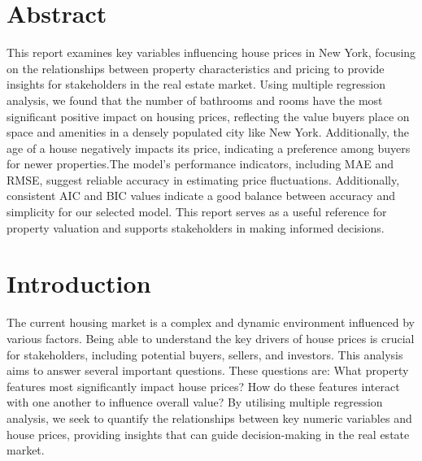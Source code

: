 \documentclass[
  twocolumn]{article}
\author{}
\date{}
\begin{document}

\section{Abstract}\label{abstract}

This report examines key variables influencing house prices in New York,
focusing on the relationships between property characteristics and
pricing to provide insights for stakeholders in the real estate market.
Using multiple regression analysis, we found that the number of
bathrooms and rooms have the most significant positive impact on housing
prices, reflecting the value buyers place on space and amenities in a
densely populated city like New York. Additionally, the age of a house
negatively impacts its price, indicating a preference among buyers for
newer properties.The model's performance indicators, including MAE and
RMSE, suggest reliable accuracy in estimating price fluctuations.
Additionally, consistent AIC and BIC values indicate a good balance
between accuracy and simplicity for our selected model. This report
serves as a useful reference for property valuation and supports
stakeholders in making informed decisions.

\section{Introduction}\label{introduction}

The current housing market is a complex and dynamic environment
influenced by various factors. Being able to understand the key drivers
of house prices is crucial for stakeholders, including potential buyers,
sellers, and investors. This analysis aims to answer several important
questions. These questions are: What property features most
significantly impact house prices? How do these features interact with
one another to influence overall value? By utilising multiple regression
analysis, we seek to quantify the relationships between key numeric
variables and house prices, providing insights that can guide
decision-making in the real estate market.
\end{document}
